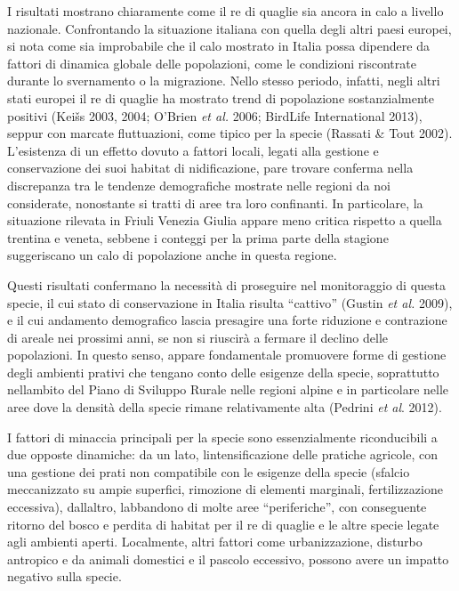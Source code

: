 I risultati mostrano chiaramente come il re di quaglie sia ancora in
calo a livello nazionale. Confrontando la situazione italiana con
quella degli altri paesi europei, si nota come sia improbabile che il
calo mostrato in Italia possa dipendere da fattori di dinamica globale
delle popolazioni, come le condizioni riscontrate durante lo
svernamento o la migrazione. Nello stesso periodo, infatti, negli altri
stati europei il re di quaglie ha mostrato trend di popolazione
sostanzialmente positivi (Kei\v{s}s 2003, 2004; O{\textquoteright}Brien
\textit{et al.} 2006; BirdLife International 2013), seppur con marcate
fluttuazioni, come tipico per la specie (Rassati \& Tout 2002).
L{\textquoteright}esistenza di un effetto dovuto a fattori locali,
legati alla gestione e conservazione dei suoi habitat di nidificazione,
pare trovare conferma nella discrepanza tra le tendenze demografiche
mostrate nelle regioni da noi considerate, nonostante si tratti di aree
tra loro confinanti. In particolare, la situazione rilevata in Friuli
Venezia Giulia appare meno critica rispetto a quella trentina e veneta,
sebbene i conteggi per la prima parte della stagione suggeriscano un
calo di popolazione anche in questa regione.

Questi risultati confermano la necessit\`a di proseguire nel
monitoraggio di questa specie, il cui stato di conservazione in Italia
risulta {\textquotedblleft}cattivo{\textquotedblright} (Gustin
\textit{et al.} 2009), e il cui andamento demografico lascia presagire
una forte riduzione e contrazione di areale nei prossimi anni, se non
si riuscir\`a a fermare il declino delle popolazioni. In questo senso,
appare fondamentale promuovere forme di gestione degli ambienti prativi
che tengano conto delle esigenze della specie, soprattutto
nell{\textquotesingle}ambito del Piano di Sviluppo Rurale nelle regioni
alpine e in particolare nelle aree dove la densit\`a della specie
rimane relativamente alta (Pedrini \textit{et al}. 2012).

I fattori di minaccia principali per la specie sono essenzialmente
riconducibili a due opposte dinamiche: da un lato,
l{\textquotesingle}intensificazione delle pratiche agricole, con una
gestione dei prati non compatibile con le esigenze della specie
(sfalcio meccanizzato su ampie superfici, rimozione di elementi
marginali, fertilizzazione eccessiva), dall{\textquotesingle}altro,
l{\textquotesingle}abbandono di molte aree
{\textquotedblleft}periferiche{\textquotedblright}, con conseguente
ritorno del bosco e perdita di habitat per il re di quaglie e le altre
specie legate agli ambienti aperti. Localmente, altri fattori come
urbanizzazione, disturbo antropico e da animali domestici e il pascolo
eccessivo, possono avere un impatto negativo sulla specie.

